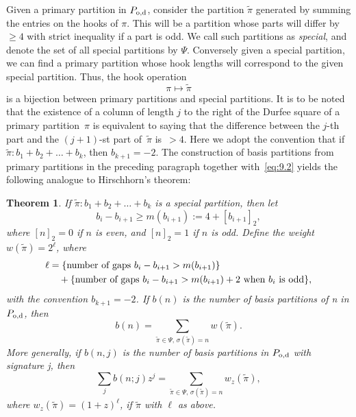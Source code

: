 \documentclass[10pt,a4paper]{amsart}
\numberwithin{equation}{section}
\newtheorem{Theorem}{Theorem}[section]
\theoremstyle{definition}
\begin{document}
Given a primary partition in $P_{\rm o,d}$, consider the partition $\tilde\pi$
generated by summing the entries on the hooks of $\pi$. This will be a
partition whose parts will differ by $\ge 4$ with strict inequality if a part
is odd. We call such partitions as {\it special},
and denote the set of all special partitions by $\Psi$.
Conversely given a special
partition, we can find a primary partition whose hook lengths will correspond
to the given special partition. Thus, the hook operation
\begin{equation}
\pi\mapsto \tilde\pi\label{eq:9.2}
\end{equation}
is a bijection between primary partitions and special partitions. It is to be
noted that the existence of a column of length $j$ to the right of the Durfee
square of a primary partition~$\pi$ is equivalent to saying
that the difference between the $j$-th part and the $(j+1)$-st part
of~$\tilde\pi$ is~${>4}$. Here we adopt the convention that if $\tilde\pi\colon
b_1+b_2+\dots +b_k$, then $b_{k+1}=-2$.
The construction of basis partitions from primary partitions in the preceding
paragraph together with~\eqref{eq:9.2} yields the following analogue to
Hirschhorn's theorem:

\begin{Theorem}
If $\tilde\pi\colon b_1+b_2+\dots+ b_k$ is a special partition, then let
\[
b_i - b_{i+1} \ge m(b_{i+1}) := 4 + [b_{i+1}]_2,
\]
where $[n]_2=0$ if $n$ is even, and $[n]_2=1$ if $n$ is odd.
Define the weight $w(\tilde\pi)=2^\ell$, where
\begin{align*}
\ell &= \{\mbox{number of gaps $ b_i - b_{i+1} > m(b_{i+1})$}\} \\
& \quad{}+
\{\mbox{number of gaps $ b_i - b_{i+1} > m(b_{i+1})+2$ when $b_i$ is odd}\},
\end{align*}
with the convention $b_{k+1}=-2$.
If $b(n)$ is the number of basis partitions of
n in $P_{\rm o,d}$, then
\begin{equation*}
b(n)=\sum_{\tilde\pi\in \Psi,\,\sigma(\tilde\pi)=n} w(\tilde\pi).%
\end{equation*}
More generally, if $b(n,j)$ is the number of basis partitions in
$P_{\rm o,d}$ {{with signature j, then}}
\begin{equation*}
\sum_jb(n;j)z^j=\sum_{\tilde\pi\in \Psi,\, \sigma(\tilde\pi)=n}w_z(\tilde\pi),%
\end{equation*}
where $w_z(\tilde\pi)=(1+z)^{\ell}$, if $\tilde\pi$ with $\ell$
as above.
\end{Theorem}
\end{document}
